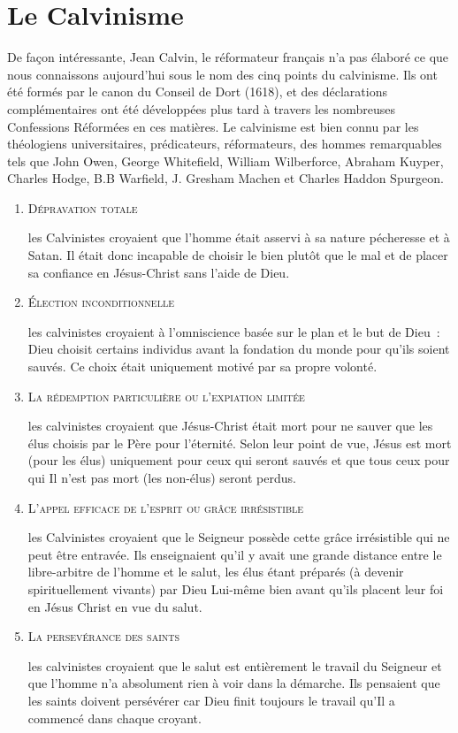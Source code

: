 \section{Le Calvinisme}

De façon intéressante, Jean Calvin, le réformateur français n’a pas élaboré ce que nous connaissons aujourd’hui sous le nom des cinq points du calvinisme. Ils ont été formés par le canon du Conseil de Dort (1618), et des déclarations complémentaires ont été développées plus tard à travers les nombreuses Confessions Réformées en ces matières. Le calvinisme est bien connu par les théologiens universitaires, prédicateurs, réformateurs, des hommes  remarquables tels que John Owen, George Whitefield, William Wilberforce, Abraham Kuyper, Charles Hodge, B.B Warfield, J. Gresham Machen et Charles Haddon Spurgeon.


\begin{enumerate}

  \item  \textsc{Dépravation totale}

les Calvinistes croyaient que l’homme était asservi à sa nature pécheresse et à Satan. Il était donc incapable de choisir le bien plutôt que le mal et de placer sa confiance en Jésus-Christ sans l'aide de Dieu.

  \item  \textsc{Élection inconditionnelle}

les calvinistes croyaient à l’omniscience basée sur le plan et le but de Dieu~: Dieu choisit certains individus avant la fondation du monde pour qu’ils soient sauvés. Ce choix était uniquement motivé par sa propre volonté.

  \item  \textsc{La rédemption particulière ou l’expiation limitée}

les calvinistes croyaient que Jésus-Christ était mort pour ne sauver que les élus choisis par le Père pour l'éternité. Selon leur point de vue, Jésus est mort (pour les élus) uniquement pour ceux qui seront sauvés et que tous ceux pour qui Il n'est pas mort (les non-élus) seront perdus.

  \item  \textsc{L'appel efficace de l'esprit ou grâce irrésistible}

les Calvinistes croyaient que le Seigneur possède cette grâce irrésistible qui ne peut être entravée. Ils enseignaient qu’il y avait une grande distance entre le libre-arbitre de l’homme et le salut, les élus étant préparés (à devenir spirituellement vivants) par Dieu Lui-même bien avant qu’ils  placent leur foi en Jésus Christ en vue du salut.

  \item  \textsc{La persevérance des saints}

les calvinistes croyaient que le salut est entièrement le travail du Seigneur et que l'homme n'a absolument rien à voir dans la démarche. Ils pensaient que les saints doivent persévérer car Dieu finit toujours le travail qu'Il a commencé dans chaque croyant.

\end{enumerate}


